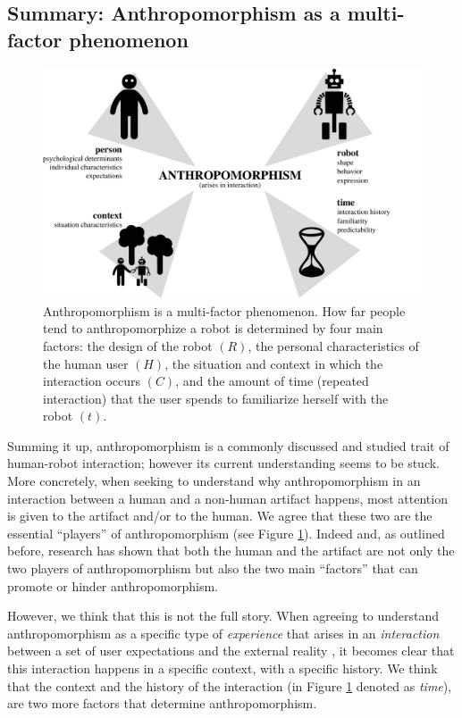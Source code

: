 \documentclass{frontiersSCNS} %
\begin{document}
\subsection{Summary: Anthropomorphism as a multi-factor phenomenon}
\label{sec:multi-factors}

\begin{figure}
    \centering
    \includegraphics[width=0.75\columnwidth]{anthropo.pdf}
    \caption{Anthropomorphism is a multi-factor phenomenon. How far people tend
    to anthropomorphize a robot is determined by four main factors: the design
    of the robot $(R)$, the personal characteristics of the human user $(H)$, the
    situation and context in which the interaction occurs $(C)$, and the amount of
    time (repeated interaction) that the user spends to familiarize herself with the
    robot $(t)$.}

    \label{fig:anthropofig}
\end{figure}


Summing it up, anthropomorphism is a commonly discussed and studied trait of
human-robot interaction; however its current understanding seems to be stuck.
More concretely, when seeking to understand why anthropomorphism in an
interaction between a human and a non-human artifact happens, most attention is
given to the artifact and/or to the human. We agree that these two are the
essential ``players'' of anthropomorphism (see Figure \ref{fig:anthropofig}).
Indeed and, as outlined before, research has shown that both the human and the
artifact are not only the two players of anthropomorphism but also the two main
``factors'' that can promote or hinder anthropomorphism.

However, we think that this is not the full story. When agreeing to understand
anthropomorphism as a specific type of \textit{experience} that arises in an
\textit{interaction} between a set of user expectations and the external reality
\citep{persson_anthropomorphism_2000}, 
it becomes clear that this interaction happens in a specific context, with a
specific history. We think that the context and the history of the interaction
(in Figure \ref{fig:anthropofig} denoted as \textit{time}), are two more factors
that determine anthropomorphism.
\end{document}
